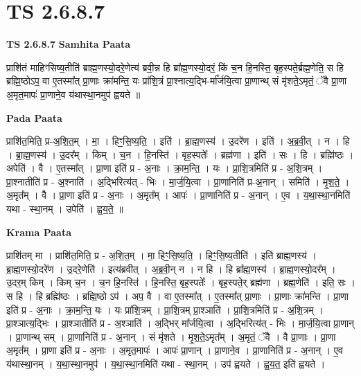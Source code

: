 \documentclass[17pt]{extarticle}
\begin{document}
\section*{ TS 2.6.8.7 }

\textbf{TS 2.6.8.7 } \newline
\textbf{Samhita Paata} \newline

प्राशि॑तं माहिꣳसिष्य॒तीति॑ ब्राह्म॒णस्यो॒दरे॒णेत्य॑ ब्रवी॒न्न हि ब्रा᳚ह्म॒णस्यो॒दरं॒ किं च॒न हि॒नस्ति॒ बृह॒स्पते॒र्ब्रह्म॒णेति॒ स हि ब्रह्मि॒ष्ठोऽप॒ वा ए॒तस्मा᳚त् प्रा॒णाः क्रा॑मन्ति॒ यः प्रा॑शि॒त्रं प्रा॒श्नात्य॒द्भि-र्मा᳚र्जयि॒त्वा प्रा॒णान्थ् सं मृ॑शते॒ऽमृतं॒ ॅवै प्रा॒णा अ॒मृत॒मापः॑ प्रा॒णाने॒व य॑थास्था॒नमुप॑ ह्वयते ॥ \newline

\textbf{Pada Paata} \newline

प्राशि॑त॒मिति॒ प्र-अ॒शि॒त॒म् । मा॒ । हिꣳ॒॒सि॒ष्य॒ति॒ । इति॑ । ब्रा॒ह्म॒णस्य॑ । उ॒दरे॑ण । इति॑ । अ॒ब्र॒वी॒त् । न । हि । ब्रा॒ह्म॒णस्य॑ । उ॒दर᳚म् । किम् । च॒न । हि॒नस्ति॑ । बृह॒स्पतेः᳚ । ब्रह्म॑णा । इति॑ । सः । हि । ब्रह्मि॑ष्ठः । अपेति॑ । वै । ए॒तस्मा᳚त् । प्रा॒णा इति॑ प्र - अ॒नाः । क्रा॒म॒न्ति॒ । यः । प्रा॒शि॒त्रमिति॑ प्र - अ॒शि॒त्रम् । प्रा॒श्नातीति॑ प्र - अ॒श्नाति॑ । अ॒द्भिरित्य॑त् - भिः । मा॒र्ज॒यि॒त्वा । प्रा॒णानिति॑ प्र-अ॒नान् । समिति॑ । मृ॒श॒ते॒ । अ॒मृत᳚म् । वै । प्रा॒णा इति॑ प्र - अ॒नाः । अ॒मृत᳚म् । आपः॑ । प्रा॒णानिति॑ प्र - अ॒नान् । ए॒व । य॒था॒स्था॒नमिति॑ यथा - स्था॒नम् । उपेति॑ । ह्व॒य॒ते॒ ॥  \newline


\textbf{Krama Paata} \newline

प्राशि॑तम् मा । प्राशि॑त॒मिति॒ प्र - अ॒शि॒त॒म् । मा॒ हिꣳ॒॒सि॒ष्य॒ति॒ । हिꣳ॒॒सि॒ष्य॒तीति॑ । इति॑ ब्राह्म॒णस्य॑ । ब्रा॒ह्म॒णस्यो॒दरे॑ण । उ॒दरे॒णेति॑ । इत्य॑ब्रवीत् । अ॒ब्र॒वी॒न् न । न हि । हि ब्रा᳚ह्म॒णस्य॑ । ब्रा॒ह्म॒णस्यो॒दर᳚म् । उ॒दर॒म् किम् । किम् च॒न । च॒न हि॒नस्ति॑ । हि॒नस्ति॒ बृह॒स्पतेः᳚ । बृह॒स्पते॒र् ब्रह्म॑णा । ब्रह्म॒णेति॑ । इति॒ सः । स हि । हि ब्रह्मि॑ष्ठः । ब्रह्मि॒ष्ठो ऽप॑ । अप॒ वै । वा ए॒तस्मा᳚त् । ए॒तस्मा᳚त् प्रा॒णाः । प्रा॒णाः क्रा॑मन्ति । प्रा॒णा इति॑ प्र - अ॒नाः । क्रा॒म॒न्ति॒ यः । यः प्रा॑शि॒त्रम् । प्रा॒शि॒त्रम् प्रा॒श्ञाति॑ । प्रा॒शि॒त्रमिति॑ प्र - अ॒शि॒त्रम् । प्रा॒श्ञात्य॒द्भिः । प्रा॒श्ञातीति॑ प्र - अ॒श्ञाति॑ । अ॒द्भिर् मा᳚र्जयि॒त्वा । अ॒द्भिरित्य॑त् - भिः । मा॒र्ज॒यि॒त्वा प्रा॒णान् । प्रा॒णान्थ् सम् । प्रा॒णानिति॑ प्र - अ॒नान् । सं मृ॑शते । मृ॒श॒ते॒ऽमृत᳚म् । अ॒मृतं॒ ॅवै । वै प्रा॒णाः । प्रा॒णा अ॒मृत᳚म् । प्रा॒णा इति॑ प्र - अ॒नाः । अ॒मृत॒मापः॑ । आपः॑ प्रा॒णान् । प्रा॒णाने॒व । प्रा॒णानिति॑ प्र - अ॒नान् । ए॒व य॑थास्था॒नम् । य॒था॒स्था॒नमुप॑ । य॒था॒स्था॒नमिति॑ यथा - स्था॒नम् । उप॑ ह्वयते । ह्व॒य॒त॒ इति॑ ह्वयते । \newline
\end{document}
